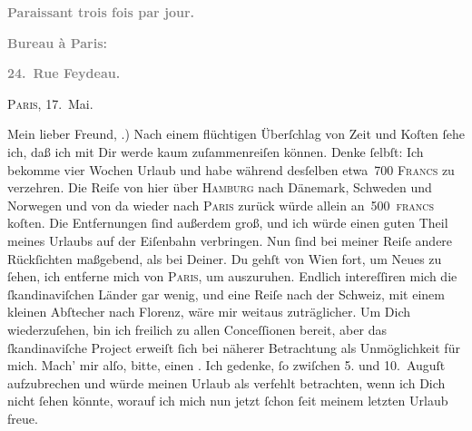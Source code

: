 \pstart
           \begin{otherlanguage}{french}\textcolor{gray}{\textbf{\textbf{Paraissant trois fois par jour.}}}\end{otherlanguage}\pend
           
\pstart
           \begin{otherlanguage}{french}\textcolor{gray}{\textbf{\textbf{Bureau à Paris:}}}\end{otherlanguage}\pend
           
\pstart
           \begin{otherlanguage}{french}\textcolor{gray}{\textbf{\textbf{24. Rue Feydeau.}}}\end{otherlanguage}\hfill \textsc{Paris}, 17. Mai.\pend
           
\pstart\center{}Mein lieber Freund,\pend\vspace{0.5em}
.) Nach einem flüchtigen Überſchlag von Zeit und Koſten{ }ſehe ich, daß ich mit Dir
               werde kaum zuſammenreiſen können. Denke{ }ſelbſt: Ich bekomme vier Wochen Urlaub und
               habe während desſelben etwa 700 \textsc{Francs} zu verzehren. Die
               Reiſe von hier über \textsc{Hamburg} nach Dänemark, Schweden und Norwegen und von da wieder nach \textsc{Paris} zurück würde allein an 500 \textsc{francs} koſten. Die
               Entfernungen {\pb}ſind außerdem groß, und ich würde
               einen guten Theil meines Urlaubs auf der Eiſenbahn verbringen. Nun{ }ſind bei meiner
               Reiſe andere Rückſichten maßgebend, als bei Deiner. Du gehſt von Wien fort, um Neues zu{ }ſehen, ich entferne mich von \textsc{Paris}, um auszuruhen. Endlich intereſſiren mich die ſkandinaviſchen Länder gar wenig, und eine Reiſe nach der Schweiz, mit einem kleinen Abſtecher nach Florenz, wäre mir weitaus zuträglicher. Um Dich wiederzuſehen,
               bin ich freilich zu allen Conceſſionen {\pb}bereit, aber
               das ſkandinaviſche Project erweiſt{ }ſich bei näherer Betrachtung als
               Unmöglichkeit für mich. Mach’ mir alſo, bitte, einen \label{K_L02774-1v}\label{K_L02774-1}. Ich gedenke,{ }ſo zwiſchen 5. und 10. Auguſt aufzubrechen und würde meinen Urlaub als
               verfehlt betrachten, wenn ich Dich nicht{ }ſehen könnte, worauf ich mich nun jetzt{ }ſchon{ }ſeit meinem letzten Urlaub freue.\pend
           
